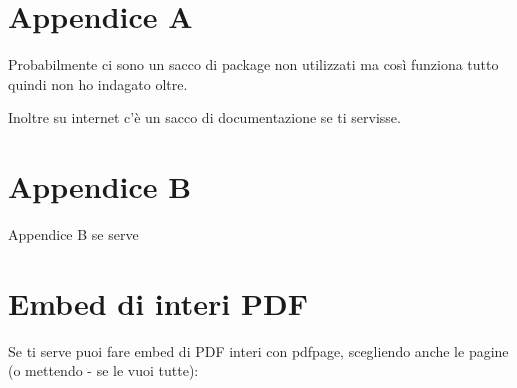 \documentclass[12pt,a4paper,twoside]{book}
\begin{document}
\renewcommand{\appendixtocname}{Appendici}
\renewcommand{\appendixpagename}{Appendici}
{}
\begin{appendices}
    \chapter{Appendice A}
    \label{Appendice:A}
    Probabilmente ci sono un sacco di package non utilizzati ma così funziona tutto quindi non ho indagato oltre.

    Inoltre su internet c'è un sacco di documentazione se ti servisse.
    \chapter{Appendice B}
    \label{Appendice:B}
    Appendice B se serve

    \chapter{Embed di interi PDF}
    \label{Appendice:C}
    Se ti serve puoi fare embed di PDF interi con pdfpage, scegliendo anche le pagine (o mettendo - se le vuoi tutte):

\end{appendices}

\end{document}
